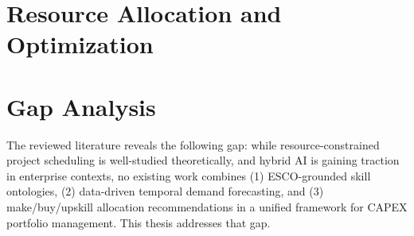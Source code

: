 
\section{Resource Allocation and Optimization}
\label{sec:lit_optimization}


\section{Gap Analysis}
\label{sec:lit_gap}

The reviewed literature reveals the following gap: while resource-constrained project scheduling is well-studied theoretically, and hybrid AI is gaining traction in enterprise contexts, no existing work combines (1) ESCO-grounded skill ontologies, (2) data-driven temporal demand forecasting, and (3) make/buy/upskill allocation recommendations in a unified framework for CAPEX portfolio management. This thesis addresses that gap.
